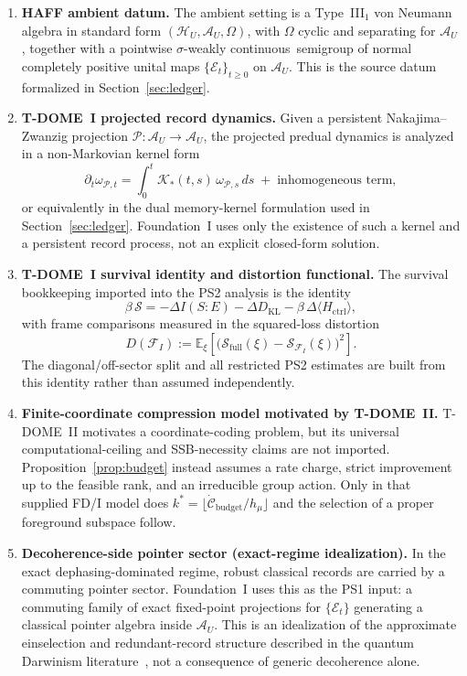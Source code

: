 \documentclass[12pt]{article}
\theoremstyle{definition}
\theoremstyle{remark}
\newcommand{\FIAppendixContinuityPhrase}{pointwise \(\sigma\)-weakly continuous}
\begin{document}
\begin{enumerate}
\item \textbf{HAFF ambient datum.}
The ambient setting is a Type~III\(_1\) von Neumann algebra in standard
form \((\mathcal H_U,\mathcal A_U,\Omega)\), with \(\Omega\) cyclic and
separating for \(\mathcal A_U\), together with a
\FIAppendixContinuityPhrase\ semigroup of normal completely positive
unital maps \(\{\mathcal E_t\}_{t\ge 0}\) on \(\mathcal A_U\). This is
the source datum formalized in Section~\ref{sec:ledger}.

\item \textbf{T-DOME~I projected record dynamics.}
Given a persistent Nakajima--Zwanzig projection
\(\mathcal P:\mathcal A_U\to\mathcal A_U\), the projected predual
dynamics is analyzed in a non-Markovian kernel form
\[
\partial_t \omega_{\mathcal P,t}
=
\int_0^t \mathcal K_*(t,s)\,\omega_{\mathcal P,s}\,ds
\;+\; \text{inhomogeneous term},
\]
or equivalently in the dual memory-kernel formulation used in
Section~\ref{sec:ledger}. Foundation~I uses only the existence of such a
kernel and a persistent record process, not an explicit closed-form
solution.

\item \textbf{T-DOME~I survival identity and distortion functional.}
The survival bookkeeping imported into the PS2 analysis is the identity
\[
\beta\,\mathcal S
=
-\Delta I(S{:}E)
-\Delta D_{\mathrm{KL}}
-\beta\,\Delta\langle H_{\mathrm{ctrl}}\rangle,
\]
with frame comparisons measured in the squared-loss distortion
\[
D(\mathcal F_I)
:=
\mathbb E_\xi\!\left[
\bigl(
\mathcal S_{\mathrm{full}}(\xi)
-\mathcal S_{\mathcal F_I}(\xi)
\bigr)^2
\right].
\]
The diagonal/off-sector split and all restricted PS2 estimates are built
from this identity rather than assumed independently.

\item \textbf{Finite-coordinate compression model motivated by
T-DOME~II.}
T-DOME~II motivates a coordinate-coding problem, but its universal
computational-ceiling and SSB-necessity claims are not imported.
Proposition~\ref{prop:budget} instead assumes a rate charge, strict
improvement up to the feasible rank, and an irreducible group action.
Only in that supplied FD/I model does
\(k^*=\lfloor\dot{\mathcal C}_{\mathrm{budget}}/h_\mu\rfloor\) and the
selection of a proper foreground subspace follow.

\item \textbf{Decoherence-side pointer sector (exact-regime idealization).}
In the exact dephasing-dominated regime, robust classical records are
carried by a commuting pointer sector. Foundation~I uses this as the
PS1 input: a commuting family of exact fixed-point projections for
\(\{\mathcal E_t\}\) generating a classical pointer algebra inside
\(\mathcal A_U\). This is an idealization of the approximate
einselection and redundant-record structure described in the quantum
Darwinism literature~\cite{Zurek2003,Zurek2009}, not a consequence of
generic decoherence alone.


\end{enumerate}
\end{document}
